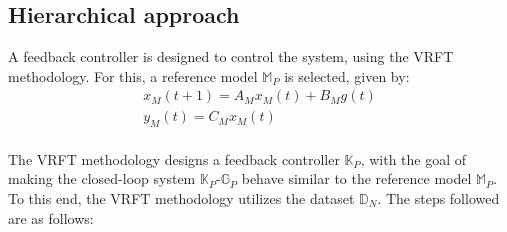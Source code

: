 \documentclass[letterpaper, 10 pt, conference]{ieeeconf}  %
\begin{document}
\subsection{Hierarchical approach}
A feedback controller is designed to control the system, using the VRFT methodology. For this, a reference model $\mathbb{M}_P$ is selected, given by:
	\begin{equation*}
	\begin{matrix}
	x_M(t+1) = A_Mx_M(t) + B_Mg(t)\\
	y_M(t) = C_Mx_M(t)
	\end{matrix}
	\end{equation*}\\  
 The VRFT methodology designs a feedback controller  $\mathbb{K}_P$, with the goal of making the closed-loop system $\mathbb{K}_P$-$\mathbb{G}_P$ behave similar to the reference model $\mathbb{M}_P$. To this end, the VRFT methodology utilizes the dataset $\mathbb{D}_N$. The steps followed are as follows:
\end{document}
